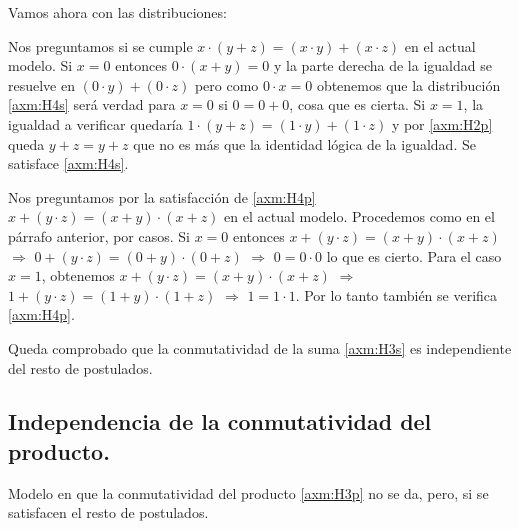 \documentclass[final,12pt,a4paper,twoside,fleqn]{extbook}
\theoremstyle{definition}
\theoremstyle{remark}
\begin{document}
	Vamos ahora con las distribuciones:



	Nos preguntamos si se cumple \( x \cdot ( y + z ) = ( x \cdot y ) + ( x
\cdot z ) \) en el actual modelo. Si \(x = 0\) entonces \( 0 \cdot (x + y) =
0 \) y la parte derecha de la igualdad se resuelve en \( ( 0 \cdot y ) + ( 0
\cdot z ) \) pero como \( 0 \cdot x = 0 \) obtenemos que la distribución
\ref{axm:H4s} será verdad para \(x = 0\) si \( 0 = 0 + 0 \), cosa que es
cierta. Si \( x = 1 \), la igualdad a verificar quedaría \( 1 \cdot ( y + z )
= ( 1 \cdot y ) + ( 1 \cdot z ) \) y por \ref{axm:H2p} queda \( y + z  =  y
+ z \) que no es más que la identidad lógica de la igualdad. Se satisface
\ref{axm:H4s}.



	Nos preguntamos por la satisfacción de \ref{axm:H4p} \( x + ( y \cdot z
) = ( x + y ) \cdot ( x + z ) \) en el actual modelo. Procedemos como en el
párrafo anterior, por casos. Si \(x = 0\) entonces \( x + ( y \cdot z ) = ( x
+ y ) \cdot ( x + z ) \) \(\Longrightarrow\) \(0 + ( y \cdot z ) = ( 0 + y )
\cdot ( 0 + z )\) \(\Longrightarrow\) \( 0 = 0 \cdot 0\) lo que es cierto.
Para el caso \(x = 1\),  obtenemos \( x + ( y \cdot z ) = ( x + y ) \cdot ( x
+ z ) \) \(\Longrightarrow\) \( 1 + ( y \cdot z ) = ( 1 + y ) \cdot ( 1 + z
)\) \(\Longrightarrow\) \( 1 = 1 \cdot 1 \). Por lo tanto también se verifica
\ref{axm:H4p}.



	Queda comprobado que la conmutatividad de la suma \ref{axm:H3s} es independiente del resto de postulados.



\subsection{Independencia de la conmutatividad del producto.}



	Modelo en que la conmutatividad del producto \ref{axm:H3p} no se da,
pero, si se satisfacen el resto de postulados.
\end{document}
